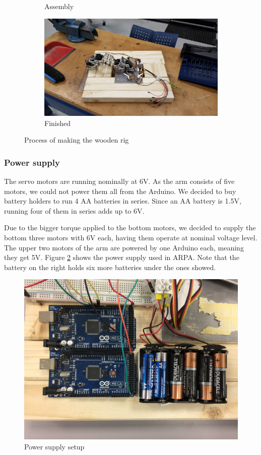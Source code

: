\documentclass[11pt,a4paper, titlepage]{article}
\begin{document}
\begin{figure}[H]
\begin{subfigure}[b]{0.45\linewidth}
\caption{Assembly}              		
\end{subfigure}
\begin{subfigure}[b]{0.45\linewidth}
\includegraphics[width=\textwidth]{../Diagrams/plank4.jpg}  
\caption{Finished}              		
\end{subfigure}
\caption{Process of making the wooden rig}
\label{fig:plank-rig}
\end{figure}

	\subsubsection{Power supply}
	\label{power}
	The servo motors are running nominally at 6V. As the arm consists of five motors, we could not power them all from the Arduino. We decided to buy battery holders to run 4 AA batteries in series. Since an AA battery is 1.5V, running four of them in series adds up to 6V.
	
	Due to the bigger torque applied to the bottom motors, we decided to supply the bottom three motors with 6V each,  having them operate at nominal voltage level. The upper two motors of the arm are powered by one Arduino each, meaning they get 5V. Figure \ref{fig:power} shows the power supply used in ARPA. Note that the battery on the right holds six more batteries under the ones showed.
	
	\begin{figure}[H]
		\centering
		\includegraphics[width=0.8\linewidth]{../Diagrams/PowerSupply.jpg}
		\caption{Power supply setup}
		\label{fig:power}
	\end{figure}
	
\end{document}
